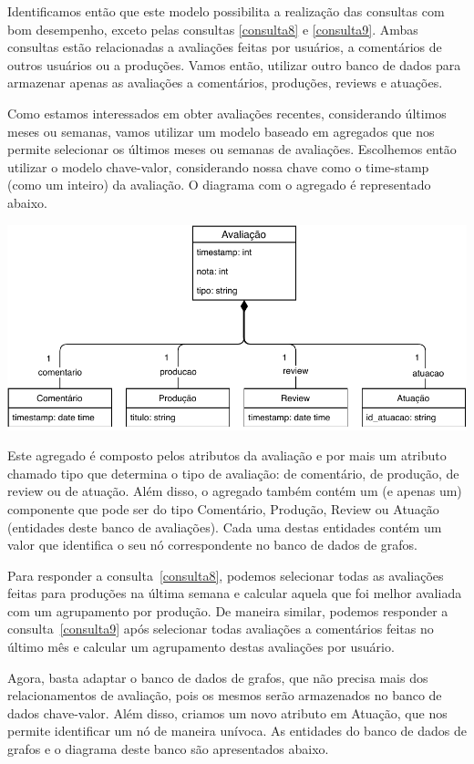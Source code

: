 \documentclass[12pt]{article}
\begin{document}
Identificamos então que este modelo possibilita a realização das 
consultas com bom desempenho, exceto pelas consultas \ref{consulta8} e
\ref{consulta9}. Ambas consultas estão relacionadas a avaliações feitas
por usuários, a comentários de outros usuários ou a produções. Vamos
então, utilizar outro banco de dados para armazenar apenas as avaliações
a comentários, produções, reviews e atuações.

Como estamos interessados em obter avaliações recentes, considerando 
últimos meses ou semanas, vamos utilizar um modelo baseado em agregados 
que nos permite selecionar os últimos meses ou semanas de avaliações. 
Escolhemos então utilizar o modelo chave-valor, considerando nossa chave
como o time-stamp (como um inteiro) da avaliação. O diagrama com o 
agregado é representado abaixo.

\begin{center}
\includegraphics[width=.8\linewidth]{agregados_avaliacao.pdf}
\end{center}

Este agregado é composto pelos atributos da avaliação e por mais um
atributo chamado {\ttfamily tipo} que determina o tipo de avaliação: de 
comentário, de produção, de review ou de atuação. Além disso, o agregado
também contém um (e apenas um) componente que pode ser do tipo 
Comentário, Produção, Review ou Atuação (entidades deste banco de 
avaliações). Cada uma destas entidades contém um valor que identifica o 
seu nó correspondente no banco de dados de grafos.

Para responder a consulta~\ref{consulta8}, podemos selecionar
todas as avaliações feitas para produções na última semana e calcular
aquela que foi melhor avaliada com um agrupamento por produção. De 
maneira similar, podemos responder a consulta~\ref{consulta9} após
selecionar todas avaliações a comentários feitas no último mês e 
calcular um agrupamento destas avaliações por usuário.

Agora, basta adaptar o banco de dados de grafos, que não precisa mais
dos relacionamentos de avaliação, pois os mesmos serão armazenados no
banco de dados chave-valor. Além disso, criamos um novo atributo em
Atuação, que nos permite identificar um nó de maneira unívoca. As 
entidades do banco de dados de grafos e o diagrama deste banco são 
apresentados abaixo.
\end{document}
